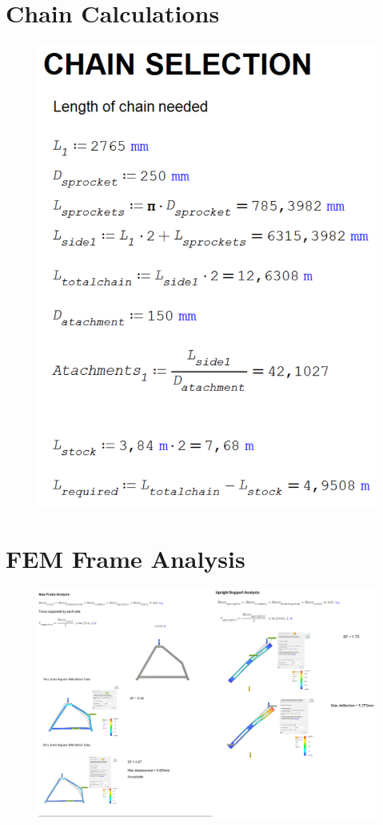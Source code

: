 \section{Chain Calculations}
\label{calcs:chain}
\begin{figure}[H]
    \centering
    \includegraphics[width=0.8\linewidth]{chaps-append/calcs/chain-length-calcs.png}
\end{figure}

\section{FEM Frame Analysis}
\label{calcs:FEM-frame}
\begin{figure}[H]
    \centering
    \includegraphics[width=1\linewidth]{figs/FEM/FEM-frame.png}
\end{figure}



